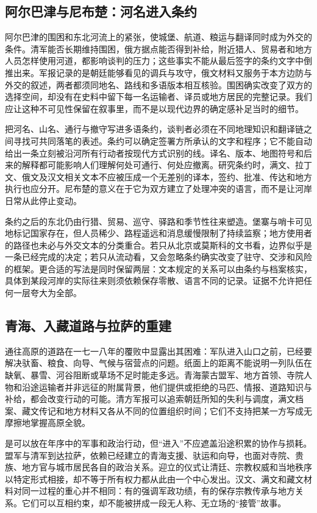 \subsection*{阿尔巴津与尼布楚：河名进入条约}

阿尔巴津的围困和东北河流上的紧张，使城堡、航道、粮运与翻译同时成为外交的条件。清军能否长期维持围困，俄方据点能否得到补给，附近猎人、贸易者和地方人员怎样使用河道，都影响谈判的压力；这些事实不能从最后签字的条约文字中倒推出来。军报记录的是朝廷能够看见的调兵与攻守，俄文材料又服务于本方边防与外交的叙述，两者都须同地名、路线和多语版本相互核验。围困确实改变了双方的选择空间，却没有在史料中留下每一名运输者、译员或地方居民的完整记录。我们应让这种不可见性保留在叙事里，而不是以现代边界的确定感补足当时的细节。

把河名、山名、通行与撤守写进多语条约，谈判者必须在不同地理知识和翻译链之间寻找可共同落笔的表述。条约可以确定签署方所承认的文字和程序；它不能自动给出一条立刻被沿河所有行动者按现代方式识别的线。译名、版本、地图符号和后来的解释都可能影响人们理解何处可通行、何处应撤离。研究条约时，满文、拉丁文、俄文及汉文相关文本不应被压成一个无差别的译本，签约、批准、传达和地方执行也应分开。尼布楚的意义在于它为双方建立了处理冲突的语言，而不是让河岸日常从此停止变动。

条约之后的东北仍由行猎、贸易、巡守、驿路和季节性往来塑造。堡寨与哨卡可见地标记国家存在，但人员稀少、路程遥远和消息缓慢限制了持续监察；地方使用者的路径也未必与外交文本的分类重合。若只从北京或莫斯科的文书看，边界似乎是一条已经完成的决定；若只从流动看，又会忽略条约确实改变了驻守、交涉和风险的框架。更合适的写法是同时保留两层：文本规定的关系可以由条约与档案核实，具体到某段河岸的实际往来则须依赖保存零散、语言不同的记录。证据不允许把任何一层夸大为全部。

\subsection*{青海、入藏道路与拉萨的重建}

通往高原的道路在一七一八年的覆败中显露出其困难：军队进入山口之前，已经要解决驮畜、粮食、向导、气候与宿营点的问题。纸面上的距离不能说明一列队伍在缺氧、暴雪、河谷阻断或草场不足时能走多远。青海蒙古盟军、地方首领、寺院人物和沿途运输者并非远征的附属背景，他们提供或拒绝的马匹、情报、道路知识与补给，都会改变行动的可能。清方军报可以追索朝廷所知的失利与调度，满文档案、藏文传记和地方材料又各从不同的位置组织时间；它们不支持把某一方写成无摩擦地掌握高原全貌。

是可以放在年序中的军事和政治行动，但“进入”不应遮盖沿途积累的协作与损耗。盟军与清军到达拉萨，依赖已经建立的青海支援、驮运和向导，也面对寺院、贵族、地方官与城市居民各自的政治关系。迎立的仪式让清廷、宗教权威和当地秩序以特定形式相接，却不等于所有权力都从此由一个中心发出。汉文、满文和藏文材料对同一过程的重心并不相同：有的强调军政功绩，有的保存宗教传承与地方关系。它们可以互相约束，却不能被拼成一段无人称、无立场的“接管”故事。

